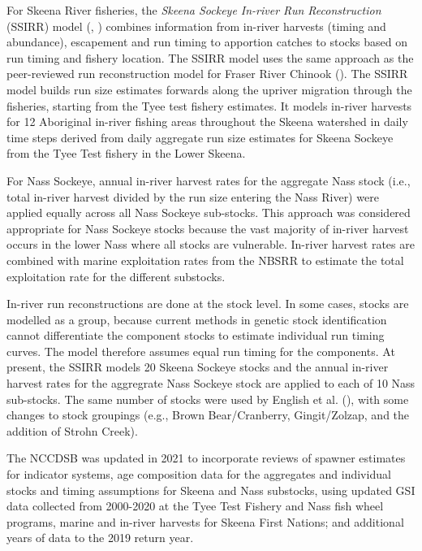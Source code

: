 \documentclass[french,11pt]{book}
\begin{document}
For Skeena River fisheries, the \emph{Skeena Sockeye In-river Run Reconstruction} (SSIRR) model (, ) combines information from in-river harvests (timing and abundance), escapement and run timing to apportion catches to stocks based on run timing and fishery location. The SSIRR model uses the same approach as the peer-reviewed run reconstruction model for Fraser River Chinook (). The SSIRR model builds run size estimates forwards along the upriver migration through the fisheries, starting from the Tyee test fishery estimates. It models in-river harvests for 12 Aboriginal in-river fishing areas throughout the Skeena watershed in daily time steps derived from daily aggregate run size estimates for Skeena Sockeye from the Tyee Test fishery in the Lower Skeena.

For Nass Sockeye, annual in-river harvest rates for the aggregate Nass stock (i.e., total in-river harvest divided by the run size entering the Nass River) were applied equally across all Nass Sockeye sub-stocks. This approach was considered appropriate for Nass Sockeye stocks because the vast majority of in-river harvest occurs in the lower Nass where all stocks are vulnerable. In-river harvest rates are combined with marine exploitation rates from the NBSRR to estimate the total exploitation rate for the different substocks.

In-river run reconstructions are done at the stock level. In some cases, stocks are modelled as a group, because current methods in genetic stock identification cannot differentiate the component stocks to estimate individual run timing curves. The model therefore assumes equal run timing for the components. At present, the SSIRR models 20 Skeena Sockeye stocks and the annual in-river harvest rates for the aggregrate Nass Sockeye stock are applied to each of 10 Nass sub-stocks. The same number of stocks were used by English et al. (), with some changes to stock groupings (e.g., Brown Bear/Cranberry, Gingit/Zolzap, and the addition of Strohn Creek).

The NCCDSB was updated in 2021 to incorporate reviews of spawner estimates for indicator systems, age composition data for the aggregates and individual stocks and timing assumptions for Skeena and Nass substocks, using updated GSI data collected from 2000-2020 at the Tyee Test Fishery and Nass fish wheel programs, marine and in-river harvests for Skeena First Nations; and additional years of data to the 2019 return year.
\end{document}

